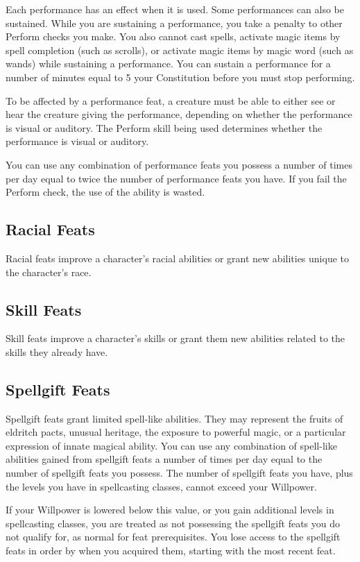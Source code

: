 Each performance has an effect when it is used.
Some performances can also be sustained.
While you are sustaining a performance, you take a  penalty to other Perform checks you make.
You also cannot cast spells, activate magic items by spell completion (such as scrolls), or activate magic items by magic word (such as wands) while sustaining a performance.
You can sustain a performance for a number of minutes equal to 5 \add your Constitution before you must stop performing.

To be affected by a performance feat, a creature must be able to either see or hear the creature giving the performance, depending on whether the performance is visual or auditory.
The Perform skill being used determines whether the performance is visual or auditory.

You can use any combination of performance feats you possess a number of times per day equal to twice the number of performance feats you have.
If you fail the Perform check, the use of the ability is wasted.

\subsection{Racial Feats}\label{Racial Feats}
Racial feats improve a character's racial abilities or grant new abilities unique to the character's race.

\subsection{Skill Feats}
Skill feats improve a character's skills or grant them new abilities related to the skills they already have.

\subsection{Spellgift Feats}
Spellgift feats grant limited spell-like abilities.
They may represent the fruits of eldritch pacts, unusual heritage, the exposure to powerful magic, or a particular expression of innate magical ability.
You can use any combination of spell-like abilities gained from spellgift feats a number of times per day equal to the number of spellgift feats you possess.
The number of spellgift feats you have, plus the levels you have in spellcasting classes, cannot exceed your Willpower.

If your Willpower is lowered below this value, or you gain additional levels in spellcasting classes, you are treated as not possessing the spellgift feats you do not qualify for, as normal for feat prerequisites.
You lose access to the spellgift feats in order by when you acquired them, starting with the most recent feat.

